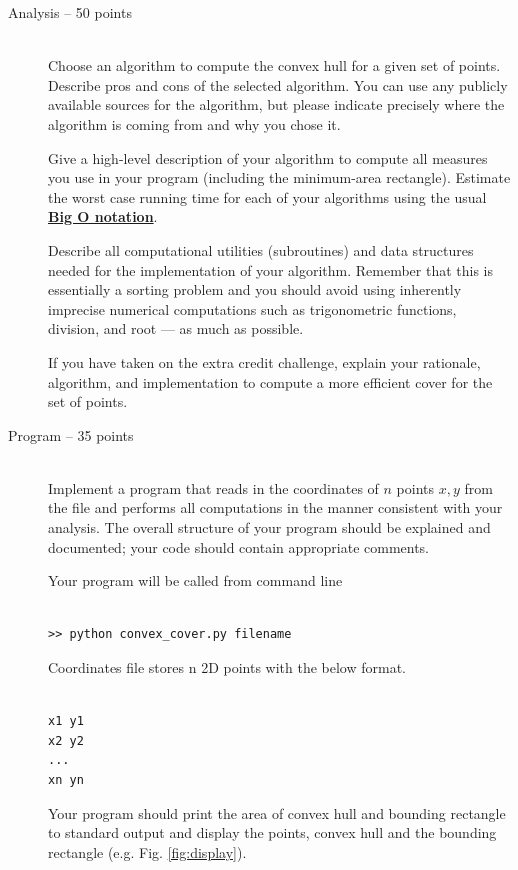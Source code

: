 \documentclass[]{article}
\begin{document}
\begin{description}

\item [Analysis -- 50 points]\hfil \\

Choose an algorithm to compute the convex hull for a given set of
points. Describe pros and cons of the selected algorithm.   You
can use any publicly available sources for the algorithm,  but
please indicate precisely where the algorithm is coming from and
why you chose it.

Give a high-level description of your algorithm to
compute all measures you use in your program (including the minimum-area
rectangle).   Estimate the worst case running time for each of your
algorithms using the usual \href{https://en.wikipedia.org/wiki/Big_O_notation}{\textbf{Big O notation}}.

Describe all computational utilities (subroutines) and data
structures needed for the implementation of your algorithm.
Remember that this is essentially a sorting problem and you should
avoid using inherently imprecise numerical computations such as
trigonometric functions, division, and root --- as much as
possible.

If you have taken on the extra credit challenge, explain your rationale,
algorithm, and implementation to compute a more efficient cover
for the set of points.

\item[Program -- 35 points] \hfil \\
Implement a program that reads in the coordinates of $n$  points
$x,y$ from the file and performs all computations
in the manner consistent with your analysis.
The overall structure of your
program should be explained and documented; your code should
contain appropriate comments.

Your program will be called from command line

\begin{lstlisting}

>> python convex_cover.py filename

\end{lstlisting}

Coordinates file stores n 2D points with the below format.

\begin{lstlisting}

x1 y1
x2 y2
...
xn yn

\end{lstlisting}
Your program should print the area of convex hull and bounding rectangle to
standard output and display the points, convex hull and the bounding rectangle (e.g. Fig. \ref{fig:display}).


\end{description}
\end{document}

